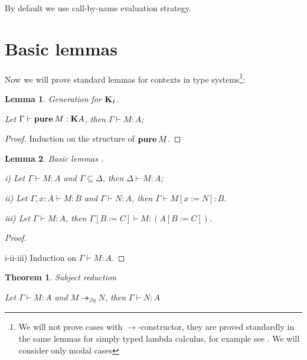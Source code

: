 \documentclass[a4paper]{article}
\newtheorem{theorem}{Theorem}
\newtheorem{lemma}{Lemma}
\begin{document}
By default we use call-by-name evaluation strategy.

  \section{Basic lemmas}

  Now we will prove standard lemmas for contexts in type systems\footnote{We will not prove cases with
  $\to$-constructor, they are proved standardly in the same lemmas for simply typed lambda calculus, for
  example see \cite{Neder} \cite{Morten} \cite{Girard}. We will consider only modal cases}:

\begin{lemma} Generation for ${\bf K}_I$.

  Let $\Gamma \vdash {\bf pure \:} M : {\bf K}A$, then $\Gamma \vdash M : A$;
\end{lemma}

\begin{proof}
  Induction on the structure of ${\bf pure \:} M$.
\end{proof}

\begin{lemma} Basic lemmas .

  i) Let $\Gamma \vdash M : A$ and $\Gamma \subseteq \Delta$, then $\Delta \vdash M : A$;

  ii) Let $\Gamma, x : A \vdash M : B$ and $\Gamma \vdash N : A$, then $\Gamma \vdash M [x := N] : B$.

  iii) Let $\Gamma \vdash M : A$, then $\Gamma [B := C] \vdash M : (A [B := C])$.
\end{lemma}

\begin{proof}
  $ $

  i-ii-iii) Induction on $\Gamma \vdash M : A$.

\end{proof}

\begin{theorem} Subject reduction

  Let $\Gamma \vdash M : A$ and $M \twoheadrightarrow_{\beta \eta} N$, then $\Gamma \vdash N : A$

\end{theorem}
\end{document}
